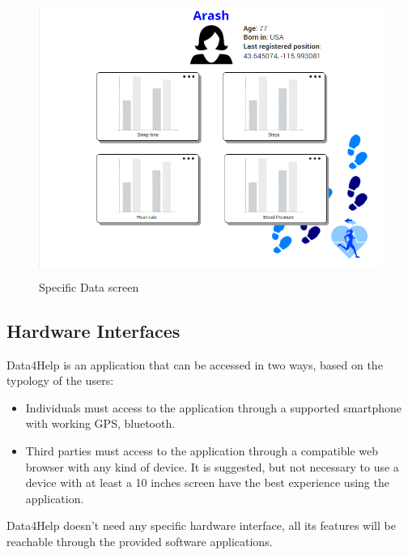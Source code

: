 \begin{figure}[H]
\centering
  \includegraphics[width=12cm,height=9cm]{resources/Screen/individualdatavisualization.png}
  \caption{Specific Data screen}
  \label{fig:WebApp Specific data screen}
\end{figure}

\subsection{Hardware Interfaces}
Data4Help is an application that can be accessed in two ways, based on the typology of the users:
\begin{itemize}
\item Individuals must access to the application through a supported smartphone with working GPS, bluetooth.
\item Third parties must access to the application through a compatible web browser with any kind of device. It is suggested, but not necessary to use a device with at least a 10 inches screen have the best experience using the application.
\end{itemize}
Data4Help doesn't need any specific hardware interface, all its features will be reachable through the provided software applications.








